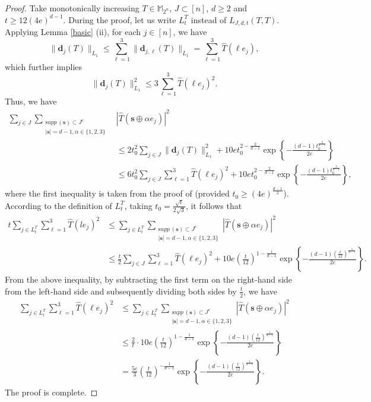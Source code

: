 \documentclass{amsbook}
\theoremstyle{definition}
\theoremstyle{remark}
\numberwithin{section}{chapter}
\numberwithin{equation}{chapter}
\newcommand{\1}{\mathbf{1}}
\newcommand{\s}{\mathbf{s}}
\newcommand{\dc}{\mathbf{d}}
\newcommand{\supp}{{\mathrm supp}\,}
\begin{document}
\begin{proof}
Take monotonically increasing $T\in \mathbb{M}_{2^n}$,  $J\subset [n]$, $d\geq2$ and $t\geq 12(4e)^{d-1}$. During the proof, let us write $L_t^T$ instead of $ L_{J,d,t}(T,T)$.
Applying Lemma \ref{basic} (ii), for each $j\in [n]$, we have
$$\|\dc_j(T)\|_{L_1}\leq \sum_{\ell=1}^3\|\dc_{j,\ell}(T)\|_{L_1}=\sum_{\ell=1}^3\widehat{T}(\ell e_{j}),$$
which further implies 
$$\|\dc_j(T)\|_{L_1}^2\leq 3 \sum_{\ell=1}^3\widehat{T}(\ell e_{j})^2.$$
Thus, we have
	\begin{equation*}\label{j-t2-1}
		\begin{aligned}
	\sum_{j\in J}\sum_{\substack{\supp(\mathbf{s})\subset J^c \\ |\mathbf{s}|=d-1,\alpha\in\{1,2,3\}}}&|\widehat{T}(\s\oplus \alpha e_j)|^2\\ &\leq2t_0^2\sum_{j\in J}\|\dc_j(T)\|_{L_1}^2+10et_0^{2-\frac{2}{d-1}}\exp\left\{-\frac{(d-1)t_0^{\frac{2}{d-1}}}{2e}\right\}\\
	&\leq 6t_0^2\sum_{j\in J}\sum_{\ell=1}^3\widehat{T}(\ell e_{j})^2+10et_0^{2-\frac{2}{d-1}}\exp\left\{-\frac{(d-1)t_0^{\frac{2}{d-1}}}{2e}\right\},
		\end{aligned}
	\end{equation*}
where the first inequality is taken from the proof of \cite[Proposition 5.2]{JLLZ2025} (provided $t_0\geq (4e)^{\frac{d-1}{2}}$).
	According to the definition of $L_t^T$,  taking $t_0=\frac{\sqrt{t}}{2\sqrt{3}}$,  it follows that
	\begin{align*}
		t\sum_{j\in L_t^{T}}\sum_{\ell=1}^3\widehat{T}(le_{j})^2&\leq \sum_{j\in L_t^{T}}\sum_{\substack{\supp(\mathbf{s})\subset J^c \\ |\mathbf{s}|=d-1,\alpha\in\{1,2,3\}}}|\widehat{T}(\s\oplus \alpha e_j)|^2\\
		&\leq\frac{t}{2}\sum_{j\in J}\sum_{\ell=1}^3\widehat{T}(\ell e_{j})^2+10e(\frac{t}{12})^{1-\frac{1}{d-1}}\exp\left\{-\frac{(d-1)(\frac{t}{12})^{\frac{1}{d-1}}}{2e}\right\}.
	\end{align*}
From the above inequality,  by subtracting the first term on the right-hand side from the left-hand side and subsequently dividing both sides by 
$\frac{t}{2}$, we have
\begin{align*}
		\sum_{j\in L_t^{T}}\sum_{\ell=1}^3\widehat{T}(\ell e_{j})^2&\leq \sum_{j\in L_t^{T}}\sum_{\substack{\supp(\mathbf{s})\subset J^c \\ |\mathbf{s}|=d-1,\alpha\in\{1,2,3\}}}|\widehat{T}(\s\oplus \alpha e_j)|^2\\
		&\leq\frac{2}{t}\cdot10e(\frac{t}{12})^{1-\frac{1}{d-1}}\exp\left\{-\frac{(d-1)(\frac{t}{12})^{\frac{1}{d-1}}}{2e}\right\}\\
        &=\frac{5e}{3}(\frac{t}{12})^{-\frac{1}{d-1}}\exp\left\{-\frac{(d-1)(\frac{t}{12})^\frac{1}{d-1}}{2e}\right\}.
	\end{align*}
The proof is complete.
\end{proof}
\end{document}
